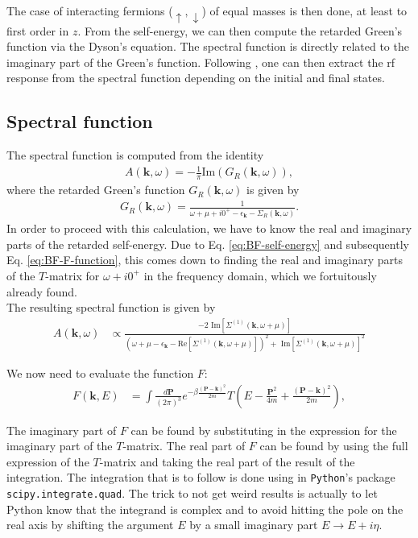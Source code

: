 \documentclass{article}
\theoremstyle{definition}
\newcommand{\f}[2]{\frac{#1}{#2}}
\begin{document}
\noindent The case of interacting fermions ($\uparrow, \downarrow$) of equal masses is then done, at least to first order in $z$. From the self-energy, we can then compute the retarded Green's function via the Dyson's equation. The spectral function is directly related to the imaginary part of the Green's function. Following \cite{haussmann2009spectral}, one can then extract the rf response from the spectral function depending on the initial and final states. 


\subsection{Spectral function}

The spectral function is computed from the identity
\begin{align}
A(\mathbf{k}, \omega) = -\f{1}{\pi}\text{Im}(G_R(\mathbf{k}, \omega)),
\end{align}
where the retarded Green's function $G_R(\mathbf{k}, \omega)$ is given by 
\begin{align}
G_R(\mathbf{k}, \omega) = \f{1}{\omega + \mu + i0^+ - \epsilon_\mathbf{k} - \Sigma_R(\mathbf{k}, \omega)}.
\end{align}
In order to proceed with this calculation, we have to know the real and imaginary parts of the retarded self-energy. Due to  Eq. \eqref{eq:BF-self-energy} and subsequently Eq. \eqref{eq:BF-F-function}, this comes down to finding the real and imaginary parts of the $T$-matrix for $\omega + i0^+$ in the frequency domain, which we fortuitously already found.\\

\noindent The resulting spectral function is given by 
\begin{align}
A(\mathbf{k}, \omega) 
&\propto
\frac
{-2 \text{ Im}[\Sigma^{(1)}(\mathbf{k}, \omega + \mu)]}
{
(\omega + \mu -\epsilon_\mathbf{k} - \text{Re}[\Sigma^{(1)}(\mathbf{k}, \omega + \mu)])^2 
+
\text{ Im}[\Sigma^{(1)}(\mathbf{k}, \omega + \mu)]^2
}
\end{align}

\noindent We now need to evaluate the function $F$:
\begin{align}
F(\mathbf{k}, E) 
&= \int \frac{d\mathbf{P}}{(2\pi)^3} e^{-\beta \frac{(\mathbf{P} - \mathbf{k})^2}{2m}} 
T\left( E - \frac{\mathbf{P}^2}{4m} + \frac{(\mathbf{P} - \mathbf{k})^2}{2m} \right),
\end{align}

\noindent The imaginary part of $F$ can be found by substituting in the expression for the imaginary part of the $T$-matrix. The real part of $F$ can be found by using the full expression of the $T$-matrix and taking the real part of the result of the integration. The integration that is to follow is done using in \texttt{Python}'s package \texttt{scipy.integrate.quad}. The trick to not get weird results is actually to let Python know that the integrand is complex and to avoid hitting the pole on the real axis by shifting the argument $E$ by a small imaginary part $E \to E + i\eta$. \\
\end{document}
